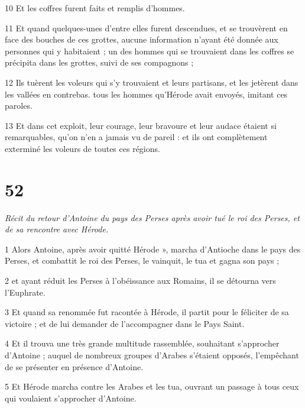 \par 10 Et les coffres furent faits et remplis d'hommes.

\par 11 Et quand quelques-unes d'entre elles furent descendues, et se trouvèrent en face des bouches de ces grottes, aucune information n'ayant été donnée aux personnes qui y habitaient ; un des hommes qui se trouvaient dans les coffres se précipita dans les grottes, suivi de ses compagnons ;

\par 12 Ils tuèrent les voleurs qui s'y trouvaient et leurs partisans, et les jetèrent dans les vallées en contrebas. tous les hommes qu'Hérode avait envoyés, imitant ces paroles.

\par 13 Et dans cet exploit, leur courage, leur bravoure et leur audace étaient si remarquables, qu'on n'en a jamais vu de pareil : et ils ont complètement exterminé les voleurs de toutes ces régions.

\chapter{52}

\par \textit{Récit du retour d'Antoine du pays des Perses après avoir tué le roi des Perses, et de sa rencontre avec Hérode.}

\par 1 Alors Antoine, après avoir quitté Hérode », marcha d'Antioche dans le pays des Perses, et combattit le roi des Perses, le vainquit, le tua et gagna son pays ;

\par 2 et ayant réduit les Perses à l'obéissance aux Romains, il se détourna vers l'Euphrate.

\par 3 Et quand sa renommée fut racontée à Hérode, il partit pour le féliciter de sa victoire ; et de lui demander de l'accompagner dans le Pays Saint.

\par 4 Et il trouva une très grande multitude rassemblée, souhaitant s'approcher d'Antoine ; auquel de nombreux groupes d'Arabes s'étaient opposés, l'empêchant de se présenter en présence d'Antoine.

\par 5 Et Hérode marcha contre les Arabes et les tua, ouvrant un passage à tous ceux qui voulaient s'approcher d'Antoine.

